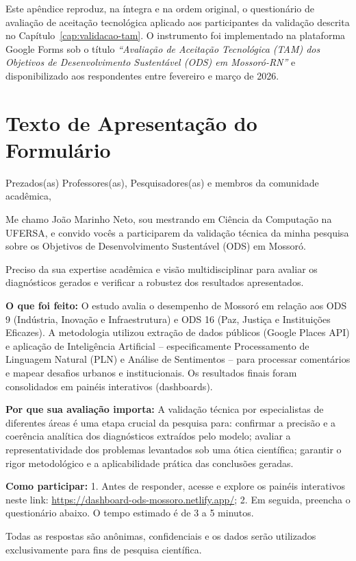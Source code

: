 \label{ap:instrumento-tam}

Este apêndice reproduz, na íntegra e na ordem original, o questionário de avaliação de aceitação tecnológica aplicado aos participantes da validação descrita no Capítulo~\ref{cap:validacao-tam}. O instrumento foi implementado na plataforma Google Forms sob o título \textit{``Avaliação de Aceitação Tecnológica (TAM) dos Objetivos de Desenvolvimento Sustentável (ODS) em Mossoró-RN''} e disponibilizado aos respondentes entre fevereiro e março de 2026.

\section*{Texto de Apresentação do Formulário}

\begin{citacao}
Prezados(as) Professores(as), Pesquisadores(as) e membros da comunidade acadêmica,

Me chamo João Marinho Neto, sou mestrando em Ciência da Computação na UFERSA, e convido vocês a participarem da validação técnica da minha pesquisa sobre os Objetivos de Desenvolvimento Sustentável (ODS) em Mossoró.

Preciso da sua expertise acadêmica e visão multidisciplinar para avaliar os diagnósticos gerados e verificar a robustez dos resultados apresentados.

\textbf{O que foi feito:} O estudo avalia o desempenho de Mossoró em relação aos ODS 9 (Indústria, Inovação e Infraestrutura) e ODS 16 (Paz, Justiça e Instituições Eficazes). A metodologia utilizou extração de dados públicos (Google Places API) e aplicação de Inteligência Artificial -- especificamente Processamento de Linguagem Natural (PLN) e Análise de Sentimentos -- para processar comentários e mapear desafios urbanos e institucionais. Os resultados finais foram consolidados em painéis interativos (dashboards).

\textbf{Por que sua avaliação importa:} A validação técnica por especialistas de diferentes áreas é uma etapa crucial da pesquisa para: confirmar a precisão e a coerência analítica dos diagnósticos extraídos pelo modelo; avaliar a representatividade dos problemas levantados sob uma ótica científica; garantir o rigor metodológico e a aplicabilidade prática das conclusões geradas.

\textbf{Como participar:} 1. Antes de responder, acesse e explore os painéis interativos neste link: \url{https://dashboard-ods-mossoro.netlify.app/}; 2. Em seguida, preencha o questionário abaixo. O tempo estimado é de 3 a 5 minutos.

Todas as respostas são anônimas, confidenciais e os dados serão utilizados exclusivamente para fins de pesquisa científica.
\end{citacao}

